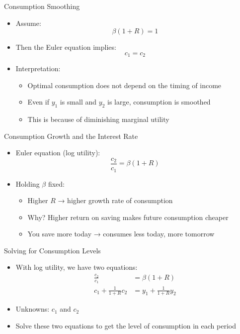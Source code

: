 \documentclass[10pt,aspectratio=169]{beamer}
\begin{document}
\begin{frame}{Consumption Smoothing}

\begin{itemize}
    \item Assume:
    \[
    \beta(1+R) = 1
    \]
    
    \item Then the Euler equation implies:
    \[
    c_1 = c_2
    \]
    
    \item Interpretation:
    \begin{itemize}
        \item Optimal consumption does not depend on the timing of income
        \item Even if \(y_1\) is small and \(y_2\) is large, consumption is smoothed
        \item This is because of diminishing marginal utility
    \end{itemize}
\end{itemize}

\end{frame}

\begin{frame}{Consumption Growth and the Interest Rate}

\begin{itemize}
    \item Euler equation (log utility):
    \[
    \frac{c_2}{c_1} = \beta (1+R)
    \]
    
    \item Holding \(\beta\) fixed:
    \begin{itemize}
        \item Higher \(R\) → higher growth rate of consumption
        \item Why? Higher return on saving makes future consumption cheaper
        \item You save more today → consumes less today, more tomorrow
    \end{itemize}
    
\end{itemize}

\end{frame}




\begin{frame}{Solving for Consumption Levels}

\begin{itemize}
    \item With log utility, we have two equations:
   \begin{align*}
   \frac{c_2}{c_1} &= \beta (1+R) \\
    c_1 + \frac{1}{1+R} c_2 &= y_1 + \frac{1}{1+R} y_2
   \end{align*}   
    \item Unknowns: \(c_1\) and \(c_2\)
    \vspace{0.2cm}
    
    \item Solve these two equations to get the level of consumption in each period
\end{itemize}

\end{frame}
\end{document}

